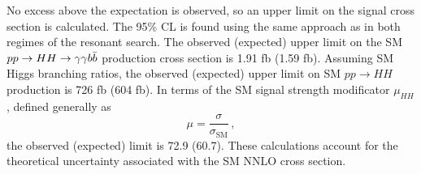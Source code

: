No excess above the expectation is observed, so an upper limit on the signal cross section is
calculated. The 95\% CL is found using the same approach as in both
regimes of the resonant search. The observed (expected) upper limit on the SM
$pp \rightarrow HH \rightarrow \gamma\gamma b\bar{b}$ production cross section is 1.91 fb (1.59 fb).
Assuming SM Higgs branching ratios, the observed (expected) upper limit on SM $pp \rightarrow HH$
production is 726 fb (604 fb). In terms of the SM signal strength modificator $\mu_{HH}$, defined
generally as
\begin{equation}
\mu = \frac{\sigma}{\sigma_\text{SM}} \, ,
\end{equation}
the observed (expected) limit is 72.9 (60.7). These calculations account for the theoretical
uncertainty associated with the SM NNLO cross section.


